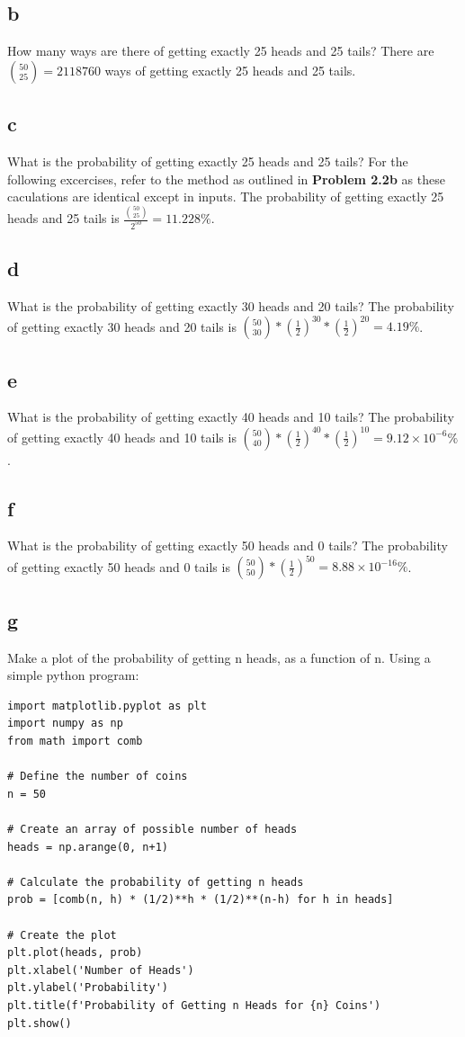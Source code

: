 \documentclass[a4paper,floatfix,nofootinbib]{article}
\begin{document}
\subsection*{b}
How many ways are there of getting exactly 25 heads and 25 tails?
There are ${50 \choose 25} = 2118760$ ways of getting exactly 25 heads and 25 tails.

\subsection*{c}
What is the probability of getting exactly 25 heads and 25 tails? For the following excercises, refer to the method as outlined in \textbf{Problem 2.2b} as these caculations are identical except in inputs. The probability of getting exactly 25 heads and 25 tails is $\frac{{50 \choose 25}}{2^{50}} = 11.228\%$.

\subsection*{d}
What is the probability of getting exactly 30 heads and 20 tails? The probability of getting exactly 30 heads and 20 tails is ${50 \choose 30} * \left(\frac{1}{2}\right)^{30} * \left(\frac{1}{2}\right)^{20} = 4.19\%$.

\subsection*{e}
What is the probability of getting exactly 40 heads and 10 tails? The probability of getting exactly 40 heads and 10 tails is ${50 \choose 40} * \left(\frac{1}{2}\right)^{40} * \left(\frac{1}{2}\right)^{10} = 9.12 \times 10^{-6} \%$.

\subsection*{f}
What is the probability of getting exactly 50 heads and 0 tails? The probability of getting exactly 50 heads and 0 tails is ${50 \choose 50} * \left(\frac{1}{2}\right)^{50} = 8.88 \times 10^{-16} \%$.

\subsection*{g}
Make a plot of the probability of getting n heads, as a function of n.
Using a simple python program: 
\begin{lstlisting}
import matplotlib.pyplot as plt
import numpy as np
from math import comb

# Define the number of coins
n = 50

# Create an array of possible number of heads
heads = np.arange(0, n+1)

# Calculate the probability of getting n heads
prob = [comb(n, h) * (1/2)**h * (1/2)**(n-h) for h in heads]

# Create the plot
plt.plot(heads, prob)
plt.xlabel('Number of Heads')
plt.ylabel('Probability')
plt.title(f'Probability of Getting n Heads for {n} Coins')
plt.show()
\end{lstlisting}
\end{document}
